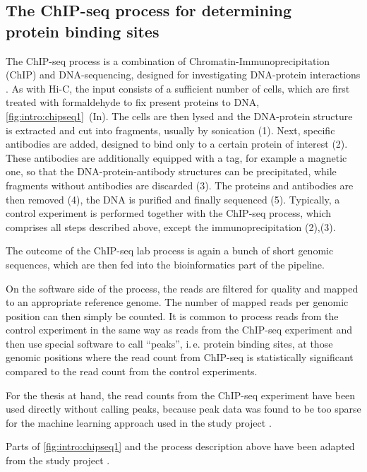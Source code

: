 \subsection[The ChIP-seq process for determining protein binding sites]{The ChIP-seq process for determining\\protein binding sites} \label{sec:intro:chipseq}
The ChIP-seq process is a combination of Chromatin-Immu\-no\-pre\-ci\-pi\-ta\-tion (ChIP) and DNA-sequencing, 
designed for investigating DNA-protein interactions \cite{Johnson2007,Robertson2007}.
As with Hi-C, the input consists of a sufficient number of cells, which are first treated with formaldehyde
to fix present proteins to DNA, \cref{fig:intro:chipseq1}~(In).
The cells are then lysed and the DNA-protein structure is extracted and cut into fragments, 
usually by sonication (1).
Next, specific antibodies are added, designed to bind only to a certain protein of interest (2).
These antibodies are additionally equipped with a tag, for example a magnetic one, so that 
the DNA-protein-antibody structures can be precipitated, while fragments without antibodies are discarded (3).
The proteins and antibodies are then removed (4), 
the DNA is purified and finally sequenced (5).
Typically, a control experiment is performed together with the ChIP-seq process, 
which comprises all steps described above, except the immunoprecipitation (2),(3).

The outcome of the ChIP-seq lab process is again a bunch of short genomic sequences, 
which are then fed into the bioinformatics part of the pipeline.

On the software side of the process, the reads are filtered for quality and mapped to an appropriate reference genome.
The number of mapped reads per genomic position can then simply be counted.
It is common to process reads from the control experiment in the same way as reads from the ChIP-seq experiment
and then use special software to call ``peaks'', i.\,e. protein binding sites,
at those genomic positions where the read count from ChIP-seq
is statistically significant compared to the read count from the control experiments.

For the thesis at hand, the read counts from the ChIP-seq experiment have been used directly without calling peaks,
because peak data was found to be too sparse for the machine learning approach used 
in the study project \cite{Krauth2020}.

Parts of \cref{fig:intro:chipseq1} and the process description above have been
adapted from the study project \cite{Krauth2020}.


